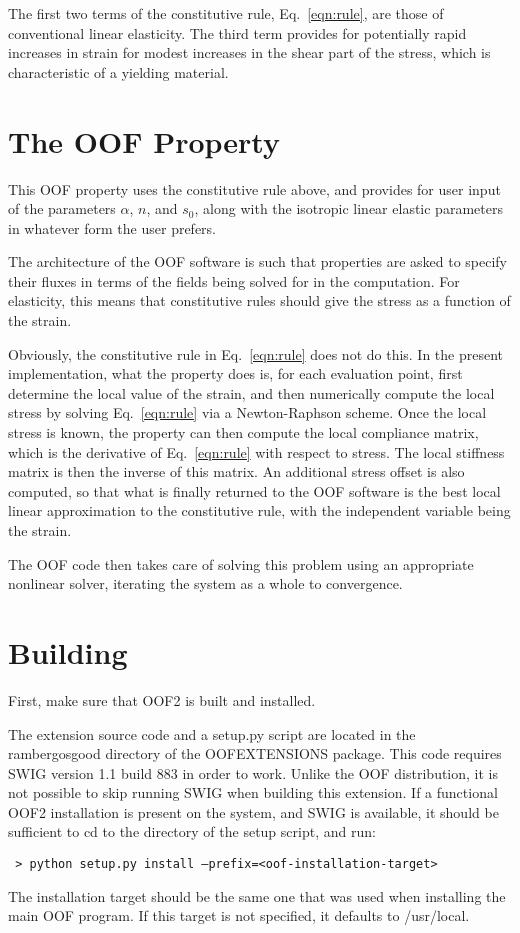 \documentclass[10pt]{article}
\begin{document}
The first two terms of the constitutive rule, Eq.~\ref{eqn:rule}, are
those of conventional linear elasticity.  The third term provides for
potentially rapid increases in strain for modest increases in the
shear part of the stress, which is characteristic of a yielding
material.

\section{The OOF Property}

This OOF property uses the constitutive rule above, and provides for
user input of the parameters $\alpha$, $n$, and $s_0$, along with the
isotropic linear elastic parameters in whatever form the user prefers.

The architecture of the OOF software is such that properties are asked
to specify their fluxes in terms of the fields being solved for in the
computation. For elasticity, this means that constitutive rules should
give the stress as a function of the strain.

Obviously, the constitutive rule in Eq.~\ref{eqn:rule} does not do
this.  In the present implementation, what the property does is, for
each evaluation point, first determine the local value of the strain,
and then numerically compute the local stress by solving
Eq.~\ref{eqn:rule} via a Newton-Raphson scheme.  Once the local stress
is known, the property can then compute the local compliance matrix,
which is the derivative of Eq.~\ref{eqn:rule} with respect to stress.
The local stiffness matrix is then the inverse of this matrix.  An
additional stress offset is also computed, so that what is finally
returned to the OOF software is the best local linear approximation to
the constitutive rule, with the independent variable being the strain.

The OOF code then takes care of solving this problem using an
appropriate nonlinear solver, iterating the system as a whole to
convergence.

\section{Building}

First, make sure that OOF2 is built and installed.

The extension source code and a setup.py script are located in the
ramberg\-osgood directory of the OOFEXTENSIONS package.  This code
requires SWIG version 1.1 build 883 in order to work. Unlike the OOF
distribution, it is not possible to skip running SWIG when building
this extension.  If a functional OOF2 installation is present on the
system, and SWIG is available, it should be sufficient to cd to the
directory of the setup script, and run:
\begin{obeylines}
\tt{
> python setup.py install --prefix=<oof-installation-target>
}
\end{obeylines}
The installation target should be the same one that was used when
installing the main OOF program. If this target is not specified, it
defaults to /usr/local.
\end{document}
